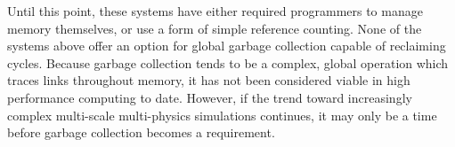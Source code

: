 Until this point, these systems have either required programmers to manage
memory themselves, or use a form of simple reference counting. None of the systems
above offer
an option for global garbage collection capable of reclaiming cycles. Because
garbage collection tends to be a complex, global operation which traces links
throughout memory, it has not been
considered viable in high performance computing to date. However, if the trend
toward increasingly complex multi-scale multi-physics simulations continues, it
may only be a time before garbage collection becomes a requirement.





